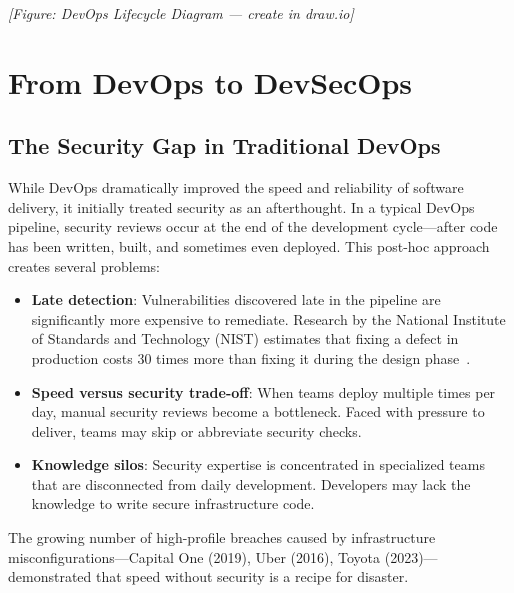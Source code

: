 
\textit{[Figure: DevOps Lifecycle Diagram — create in draw.io]}

\section{From DevOps to DevSecOps}

\subsection{The Security Gap in Traditional DevOps}

While DevOps dramatically improved the speed and reliability of software delivery, it initially treated security as an afterthought. In a typical DevOps pipeline, security reviews occur at the end of the development cycle—after code has been written, built, and sometimes even deployed. This post-hoc approach creates several problems:

\begin{itemize}
    \item \textbf{Late detection}: Vulnerabilities discovered late in the pipeline are significantly more expensive to remediate. Research by the National Institute of Standards and Technology (NIST) estimates that fixing a defect in production costs 30 times more than fixing it during the design phase~\cite{nist}.
    \item \textbf{Speed versus security trade-off}: When teams deploy multiple times per day, manual security reviews become a bottleneck. Faced with pressure to deliver, teams may skip or abbreviate security checks.
    \item \textbf{Knowledge silos}: Security expertise is concentrated in specialized teams that are disconnected from daily development. Developers may lack the knowledge to write secure infrastructure code.
\end{itemize}

The growing number of high-profile breaches caused by infrastructure misconfigurations—Capital One (2019), Uber (2016), Toyota (2023)—demonstrated that speed without security is a recipe for disaster.

